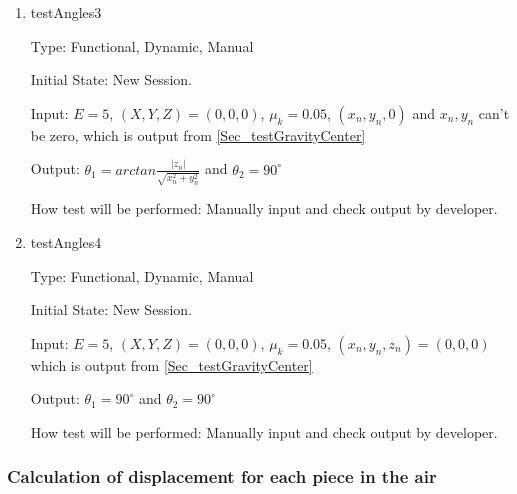 \documentclass[12pt, titlepage]{article}
\begin{document}
\begin{enumerate}
\item{testAngles3\\}

Type: Functional, Dynamic, Manual

Initial State: New Session.

Input: $E = 5$, $(X,Y,Z) = (0,0,0)$, $\mu_{k} = 0.05$, $(x_{n},y_{n},0)$ and $x_{n},y_{n}$ can't be zero, which is output from \ref{Sec_testGravityCenter}  

Output: $\theta_{1}=arctan \frac{|z_{n}|}{\sqrt{x_{n}^2+y_{n}^2}}$ and $\theta_{2}=90^{\circ}$

How test will be performed: Manually input and check output by developer.

\item{testAngles4\\}

Type: Functional, Dynamic, Manual

Initial State: New Session.

Input: $E = 5$, $(X,Y,Z) = (0,0,0)$, $\mu_{k} = 0.05$, $(x_{n},y_{n},z_{n}) = (0,0,0)$ which is output from \ref{Sec_testGravityCenter}  

Output: $\theta_{1}=90^{\circ}$ and $\theta_{2}=90^{\circ}$

How test will be performed: Manually input and check output by developer.

\end{enumerate}



\subsubsection{Calculation of displacement for each piece in the air}
\label{Sec_TestMotionAir}
\end{document}
